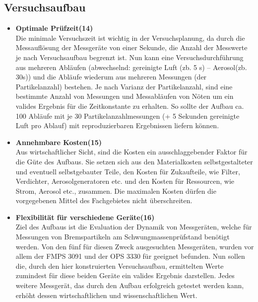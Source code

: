 \subsection{Versuchsaufbau}
\begin{itemize}
\item \textbf{Optimale Pr\"{u}fzeit(14)}\\ 
Die minimale Versuchszeit ist wichtig in der Versuchsplanung, da durch die Messaufl\"{o}sung der Messger\"{a}te von einer Sekunde, die Anzahl der Messwerte je nach Versuchsaufbau begrenzt ist. Nun kann eine Versuchsdurchf\"{u}hrung aus mehreren Abl\"{a}ufen (abwechselnd: gereinigte Luft (zb. 5 s) -- Aerosol(zb. 30s)) und die Abl\"{a}ufe wiederum aus mehreren Messungen (der Partikelanzahl) bestehen. Je nach Varianz der Partikelanzahl, sind eine bestimmte Anzahl von Messungen und Messabl\"{a}ufen von N\"{o}ten um ein valides Ergebnis f\"{u}r die Zeitkonstante zu erhalten. So sollte der Aufbau ca. 100 Abl\"{a}ufe mit je 30 Partikelanzahlmessungen (+ 5 Sekunden gereinigte Luft pro Ablauf) mit reproduzierbaren Ergebnissen liefern k\"{o}nnen.

\item \textbf{Annehmbare Kosten(15)}\\
Aus wirtschaftlicher Sicht, sind die Kosten ein ausschlaggebender Faktor für die G\"{u}te des Aufbaus. Sie setzen sich aus den Materialkosten selbstgestalteter und eventuell selbstgebauter Teile, den Kosten für Zukaufteile, wie Filter, Verdichter, Aerosolgeneratoren etc. und den Kosten f\"{u}r Ressourcen, wie Strom, Aerosol etc., zusammen. Die maximalen Kosten d\"{u}rfen die vorgegebenen Mittel des Fachgebietes nicht \"{u}berschreiten. 

\item \textbf{Flexibilit\"{a}t f\"{u}r verschiedene Ger\"{a}te(16)}\\
Ziel des Aufbaus ist die Evaluation der Dynamik von Messger\"{a}ten, welche f\"{u}r Messungen von Bremspartikeln am Schwungmassenpr\"{u}fstand ben\"{o}tigt werden. Von den f\"{u}nf f\"{u}r diesen Zweck ausgesuchten Messger\"{a}ten, wurden vor allem der FMPS 3091 und der OPS 3330 f\"{u}r geeignet befunden. Nun sollen die, durch den hier konstruierten Versuchsaufbau, ermittelten Werte zumindest f\"{u}r diese beiden Ger\"{a}te ein valides Ergebnis darstellen. Jedes weitere Messger\"{a}t, das durch den Aufbau erfolgreich getestet werden kann, erh\"{o}ht dessen wirtschaftlichen und wissenschaftlichen Wert.
\end{itemize}

